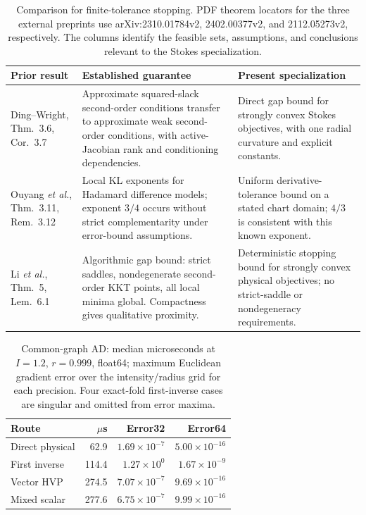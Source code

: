 \documentclass[10pt,a4paper]{article}
\begin{document}
\begin{table}[H]
\caption{Comparison for finite-tolerance stopping. PDF theorem locators for the three external preprints use arXiv:2310.01784v2, 2402.00377v2, and 2112.05273v2, respectively. The columns identify the feasible sets, assumptions, and conclusions relevant to the Stokes specialization.}
\label{tab:stoppingprior}
\centering\small\renewcommand{\arraystretch}{1.12}
\begin{tabularx}{\textwidth}{@{}p{}p{}X@{}}\toprule
Prior result & Established guarantee & Present specialization\\\midrule
Ding--Wright, Thm.~3.6, Cor.~3.7 \cite{supp-dingwright} & Approximate squared-slack second-order conditions transfer to approximate weak second-order conditions, with active-Jacobian rank and conditioning dependencies. & Direct gap bound for strongly convex Stokes objectives, with one radial curvature and explicit constants.\\
Ouyang \emph{et al.}, Thm.~3.11, Rem.~3.12 \cite{supp-ouyang} & Local KL exponents for Hadamard difference models; exponent $3/4$ occurs without strict complementarity under error-bound assumptions. & Uniform derivative-tolerance bound on a stated chart domain; $4/3$ is consistent with this known exponent.\\
Li \emph{et al.}, Thm.~5, Lem.~6.1 \cite{supp-hadamard} & Algorithmic gap bound: strict saddles, nondegenerate second-order KKT points, all local minima global. Compactness gives qualitative proximity. & Deterministic stopping bound for strongly convex physical objectives; no strict-saddle or nondegeneracy requirements.\\\bottomrule
\end{tabularx}
\end{table}

\begin{table}[H]
\caption{Common-graph AD: median microseconds at $I=1.2$, $r=0.999$, float64; maximum Euclidean gradient error over the intensity/radius grid for each precision. Four exact-fold first-inverse cases are singular and omitted from error maxima.}
\label{tab:adcost}
\centering\small
\begin{tabular}{@{}lrrr@{}}\toprule
Route & $\mu$s & Error32 & Error64\\\midrule
Direct physical & 62.9 & $1.69\!\times\!10^{-7}$ & $5.00\!\times\!10^{-16}$\\
First inverse & 114.4 & $1.27\!\times\!10^{0}$ & $1.67\!\times\!10^{-9}$\\
Vector HVP & 274.5 & $7.07\!\times\!10^{-7}$ & $9.69\!\times\!10^{-16}$\\
Mixed scalar & 277.6 & $6.75\!\times\!10^{-7}$ & $9.99\!\times\!10^{-16}$\\
\bottomrule
\end{tabular}
\end{table}
\end{document}
